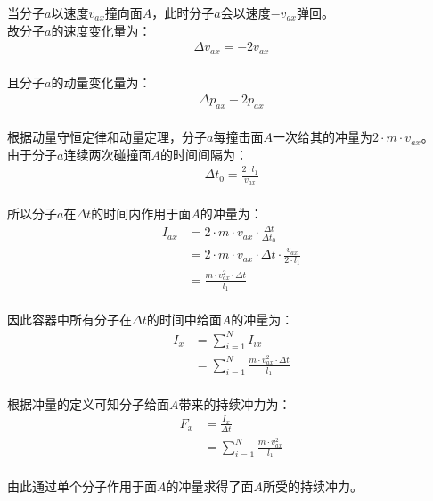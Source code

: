 \documentclass[UTF8]{ctexart}
\begin{document}
\newpage

    当分子$a$以速度$v_{ax}$撞向面$A$，此时分子$a$会以速度$-v_{ax}$弹回。\\[3mm]
    故分子$a$的速度变化量为：
    \begin{align}
        \Delta v_{ax}=-2v_{ax}
    \end{align}\\
    且分子$a$的动量变化量为：
    \begin{align}
        \Delta p_{ax}-2p_{ax}
    \end{align}\\
    根据动量守恒定律和动量定理，分子$a$每撞击面$A$一次给其的冲量为$2\cdot m\cdot v_{ax}$。\\[6mm]
    由于分子$a$连续两次碰撞面$A$的时间间隔为：
    \begin{align}
        \Delta t_0=\frac{2\cdot l_1}{v_{ax}}
    \end{align}\\
    所以分子$a$在$\Delta t$的时间内作用于面$A$的冲量为：\vspace{5pt}
    \begin{align}
        I_{ax}
        &=2\cdot m\cdot v_{ax}\cdot\frac{\Delta t}{\Delta t_0}\\[3mm]
        &=2\cdot m\cdot v_{ax}\cdot\Delta t\cdot\frac{v_{ax}}{2\cdot l_1}\\[3mm]
        &=\frac{m\cdot v_{ax}^2\cdot\Delta t}{l_1}
    \end{align}\\
    因此容器中所有分子在$\Delta t$的时间中给面$A$的冲量为：\vspace{5pt}
    \begin{align}
        I_x
        &=\sum_{i=1}^{N}I_{ix}\\[3mm]
        &=\sum_{i=1}^{N}\frac{m\cdot v_{ax}^2\cdot\Delta t}{l_1}
    \end{align}\\
    根据冲量的定义可知分子给面$A$带来的持续冲力为：\vspace{5pt}
    \begin{align}
        F_x
        &=\frac{I_x}{\Delta t}\\[3mm]
        &=\sum_{i=1}^{N}\frac{m\cdot v_{ax}^2}{l_1}
    \end{align}\\
    由此通过单个分子作用于面$A$的冲量求得了面$A$所受的持续冲力。

\newpage
\end{document}
